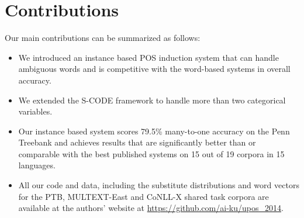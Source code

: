 \section{Contributions}
\label{sec:contrib}
Our main contributions can be summarized as follows:
\begin{itemize}
\item We introduced an instance based POS induction system that can
  handle ambiguous words and is competitive with the word-based systems in
  overall accuracy.  
\item We extended the S-CODE framework to handle more than two categorical
  variables. 
\item Our instance based system scores 79.5\% many-to-one accuracy on
  the Penn Treebank and achieves results that are significantly better
  than or comparable with the best published systems on 15 out of 19
  corpora in 15 languages.
\item All our code and data, including the substitute distributions
  and word vectors for the PTB, MULTEXT-East and CoNLL-X shared task
  corpora are available at the authors' website at
  \mbox{\url{https://github.com/ai-ku/upos_2014}}.
\end{itemize}

